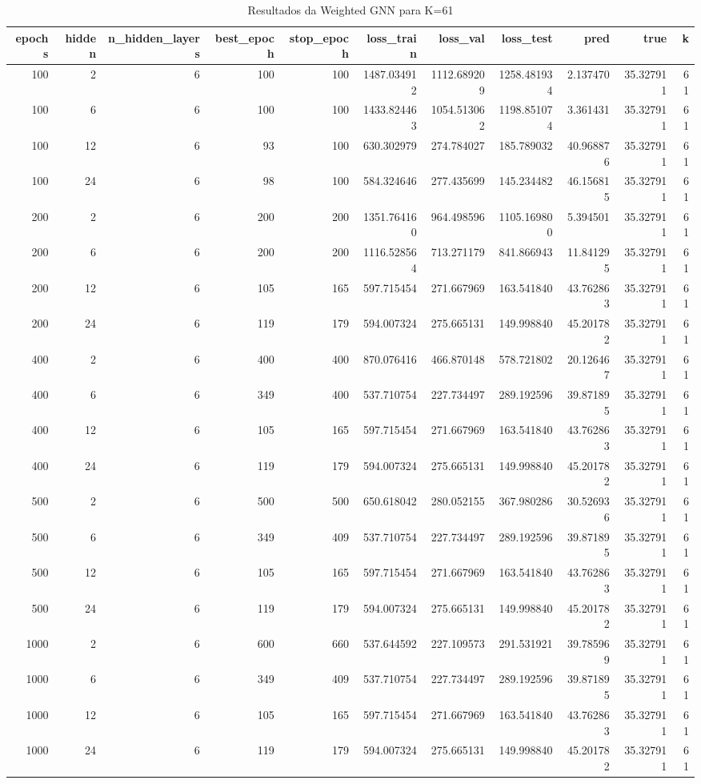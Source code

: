 \begin{table}
\caption{Resultados da Weighted GNN para K=61}
\label{tab:weighted_gnn_results_k61}
\begin{tabular}{rrrrrrrrrrr}
\toprule
epochs & hidden & n\_hidden\_layers & best\_epoch & stop\_epoch & loss\_train & loss\_val & loss\_test & pred & true & k \\
\midrule
100 & 2 & 6 & 100 & 100 & 1487.034912 & 1112.689209 & 1258.481934 & 2.137470 & 35.327911 & 61 \\
100 & 6 & 6 & 100 & 100 & 1433.824463 & 1054.513062 & 1198.851074 & 3.361431 & 35.327911 & 61 \\
100 & 12 & 6 & 93 & 100 & 630.302979 & 274.784027 & 185.789032 & 40.968876 & 35.327911 & 61 \\
100 & 24 & 6 & 98 & 100 & 584.324646 & 277.435699 & 145.234482 & 46.156815 & 35.327911 & 61 \\
200 & 2 & 6 & 200 & 200 & 1351.764160 & 964.498596 & 1105.169800 & 5.394501 & 35.327911 & 61 \\
200 & 6 & 6 & 200 & 200 & 1116.528564 & 713.271179 & 841.866943 & 11.841295 & 35.327911 & 61 \\
200 & 12 & 6 & 105 & 165 & 597.715454 & 271.667969 & 163.541840 & 43.762863 & 35.327911 & 61 \\
200 & 24 & 6 & 119 & 179 & 594.007324 & 275.665131 & 149.998840 & 45.201782 & 35.327911 & 61 \\
400 & 2 & 6 & 400 & 400 & 870.076416 & 466.870148 & 578.721802 & 20.126467 & 35.327911 & 61 \\
400 & 6 & 6 & 349 & 400 & 537.710754 & 227.734497 & 289.192596 & 39.871895 & 35.327911 & 61 \\
400 & 12 & 6 & 105 & 165 & 597.715454 & 271.667969 & 163.541840 & 43.762863 & 35.327911 & 61 \\
400 & 24 & 6 & 119 & 179 & 594.007324 & 275.665131 & 149.998840 & 45.201782 & 35.327911 & 61 \\
500 & 2 & 6 & 500 & 500 & 650.618042 & 280.052155 & 367.980286 & 30.526936 & 35.327911 & 61 \\
500 & 6 & 6 & 349 & 409 & 537.710754 & 227.734497 & 289.192596 & 39.871895 & 35.327911 & 61 \\
500 & 12 & 6 & 105 & 165 & 597.715454 & 271.667969 & 163.541840 & 43.762863 & 35.327911 & 61 \\
500 & 24 & 6 & 119 & 179 & 594.007324 & 275.665131 & 149.998840 & 45.201782 & 35.327911 & 61 \\
1000 & 2 & 6 & 600 & 660 & 537.644592 & 227.109573 & 291.531921 & 39.785969 & 35.327911 & 61 \\
1000 & 6 & 6 & 349 & 409 & 537.710754 & 227.734497 & 289.192596 & 39.871895 & 35.327911 & 61 \\
1000 & 12 & 6 & 105 & 165 & 597.715454 & 271.667969 & 163.541840 & 43.762863 & 35.327911 & 61 \\
1000 & 24 & 6 & 119 & 179 & 594.007324 & 275.665131 & 149.998840 & 45.201782 & 35.327911 & 61 \\
\bottomrule
\end{tabular}
\end{table}
